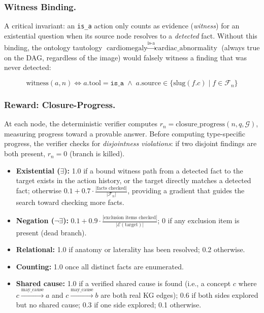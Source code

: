 \documentclass[runningheads]{llncs}
\begin{document}
\subsubsection{Witness Binding.}
\label{sec:witness_binding}

A critical invariant: an \texttt{is\_a} action only counts as evidence
(\emph{witness}) for an existential question when its source node resolves
to a \emph{detected} fact.
Without this binding, the ontology tautology
$\text{cardiomegaly} \xrightarrow{\text{is-a}} \text{cardiac\_abnormality}$
(always true on the DAG, regardless of the image) would falsely witness a
finding that was never detected:

\begin{equation}
  \text{witness}(a, n) \iff a.\text{tool} = \texttt{is\_a}
    \;\wedge\; a.\text{source} \in
    \{\text{slug}(f.c) \mid f \in \mathcal{F}_n\}
  \label{eq:witness}
\end{equation}

\subsubsection{Reward: Closure-Progress.}
\label{sec:closure_progress}
At each node, the deterministic verifier computes
$r_n = \text{closure\_progress}(n, q, \mathcal{G})$, measuring progress
toward a provable answer.
Before computing type-specific progress, the verifier checks for
\emph{disjointness violations}: if two disjoint findings are both present,
$r_n = 0$ (branch is killed).

\begin{itemize}
  \item \textbf{Existential ($\exists$):} 1.0 if a bound witness path from
    a detected fact to the target exists in the action history, or the target
    directly matches a detected fact; otherwise
    $0.1 + 0.7 \cdot \frac{|\text{facts checked}|}{|\mathcal{F}_n|}$,
    providing a gradient that guides the search toward checking more facts.
  \item \textbf{Negation ($\neg\exists$):} $0.1 + 0.9 \cdot
    \frac{|\text{exclusion items checked}|}{|\mathcal{E}(\text{target})|}$;
    0 if any exclusion item is present (dead branch).
  \item \textbf{Relational:} 1.0 if anatomy or laterality has been
    resolved; 0.2 otherwise.
  \item \textbf{Counting:} 1.0 once all distinct facts are enumerated.
  \item \textbf{Shared cause:} 1.0 if a verified shared cause is found
    (i.e., a concept $c$ where $c \xrightarrow{\text{may\_cause}} a$ and
    $c \xrightarrow{\text{may\_cause}} b$ are both real KG edges);
    0.6 if both sides explored but no shared cause; 0.3 if one side
    explored; 0.1 otherwise.
\end{itemize}
\end{document}
